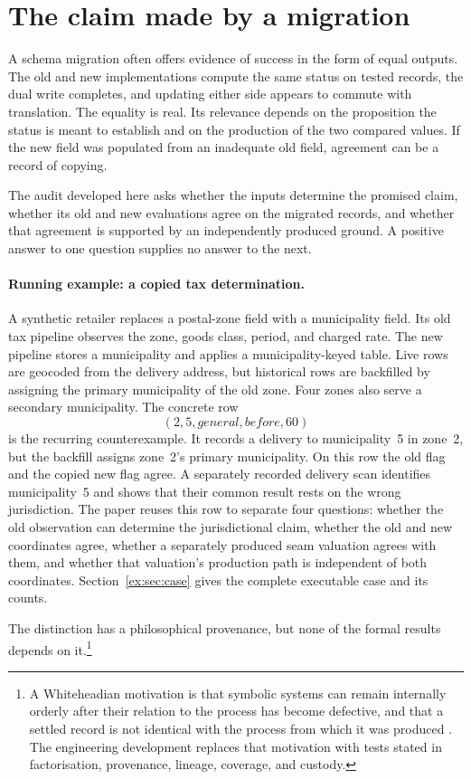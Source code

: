\documentclass[smallextended,envcountsect,envcountsame,natbib]{svjour3}
\begin{document}
\section{The claim made by a migration}\label{ex:sec:intro}
A schema migration often offers evidence of success in the form of equal outputs. The old and new implementations compute the same status on tested records, the dual write completes, and updating either side appears to commute with translation. The equality is real. Its relevance depends on the proposition the status is meant to establish and on the production of the two compared values. If the new field was populated from an inadequate old field, agreement can be a record of copying.

The audit developed here asks whether the inputs determine the promised claim, whether its old and new evaluations agree on the migrated records, and whether that agreement is supported by an independently produced ground. A positive answer to one question supplies no answer to the next.

\paragraph{Running example: a copied tax determination.} A synthetic retailer replaces a postal-zone field with a municipality field. Its old tax pipeline observes the zone, goods class, period, and charged rate. The new pipeline stores a municipality and applies a municipality-keyed table. Live rows are geocoded from the delivery address, but historical rows are backfilled by assigning the primary municipality of the old zone. Four zones also serve a secondary municipality. The concrete row
\[
(2,5,\mathit{general},\mathit{before},60)
\]
is the recurring counterexample. It records a delivery to municipality~5 in zone~2, but the backfill assigns zone~2's primary municipality. On this row the old flag and the copied new flag agree. A separately recorded delivery scan identifies municipality~5 and shows that their common result rests on the wrong jurisdiction. The paper reuses this row to separate four questions: whether the old observation can determine the jurisdictional claim, whether the old and new coordinates agree, whether a separately produced seam valuation agrees with them, and whether that valuation's production path is independent of both coordinates. Section~\ref{ex:sec:case} gives the complete executable case and its counts.

The distinction has a philosophical provenance, but none of the formal results depends on it.\footnote{A Whiteheadian motivation is that symbolic systems can remain internally orderly after their relation to the process has become defective, and that a settled record is not identical with the process from which it was produced \citep{whitehead1927symbolism,whitehead1929}. The engineering development replaces that motivation with tests stated in factorisation, provenance, lineage, coverage, and custody.}
\end{document}
